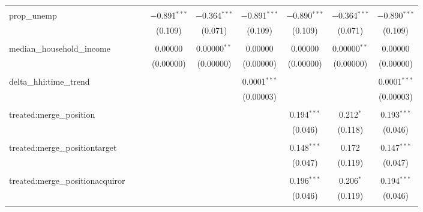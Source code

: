 \begin{table}[H]
{\begin{tabular}{@{\extracolsep{5pt}}lcccccccc}
   & & & & & & & & \\  

  prop\_unemp &  &  & $-$0.891$^{***}$ & $-$0.364$^{***}$ & $-$0.891$^{***}$ & $-$0.890$^{***}$ & $-$0.364$^{***}$ & $-$0.890$^{***}$ \\  

   &  &  & (0.109) & (0.071) & (0.109) & (0.109) & (0.071) & (0.109) \\  

   & & & & & & & & \\  

  median\_household\_income &  &  & 0.00000 & 0.00000$^{**}$ & 0.00000 & 0.00000 & 0.00000$^{**}$ & 0.00000 \\  

   &  &  & (0.00000) & (0.00000) & (0.00000) & (0.00000) & (0.00000) & (0.00000) \\  

   & & & & & & & & \\  

  delta\_hhi:time\_trend &  &  &  &  & 0.0001$^{***}$ &  &  & 0.0001$^{***}$ \\  

   &  &  &  &  & (0.00003) &  &  & (0.00003) \\  

   & & & & & & & & \\  

  treated:merge\_position &  &  &  &  &  & 0.194$^{***}$ & 0.212$^{*}$ & 0.193$^{***}$ \\  

   &  &  &  &  &  & (0.046) & (0.118) & (0.046) \\  

   & & & & & & & & \\  

  treated:merge\_positiontarget &  &  &  &  &  & 0.148$^{***}$ & 0.172 & 0.147$^{***}$ \\  

   &  &  &  &  &  & (0.047) & (0.119) & (0.047) \\  

   & & & & & & & & \\  

  treated:merge\_positionacquiror &  &  &  &  &  & 0.196$^{***}$ & 0.206$^{*}$ & 0.194$^{***}$ \\  

   &  &  &  &  &  & (0.046) & (0.119) & (0.046) \\  

   & & & & & & & & \\  


\end{tabular}}
\end{table}
